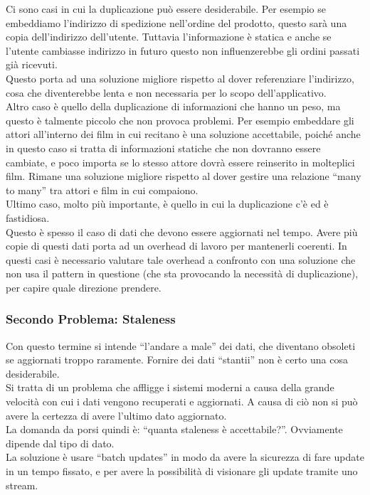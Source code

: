 \noindent Ci sono casi in cui la duplicazione può essere desiderabile. Per esempio se embeddiamo l'indirizzo di spedizione nell'ordine del prodotto, questo sarà una copia dell'indirizzo dell'utente. Tuttavia l'informazione è statica e anche se l'utente cambiasse indirizzo in futuro questo non influenzerebbe gli ordini passati già ricevuti.\\
Questo porta ad una soluzione migliore rispetto al dover referenziare l'indirizzo, cosa che diventerebbe lenta e non necessaria per lo scopo dell'applicativo.\\

\noindent Altro caso è quello della duplicazione di informazioni che hanno un peso, ma questo è talmente piccolo che non provoca problemi. Per esempio embeddare gli attori all'interno dei film in cui recitano è una soluzione accettabile, poiché anche in questo caso si tratta di informazioni statiche che non dovranno essere cambiate, e poco importa se lo stesso attore dovrà essere reinserito in molteplici film. Rimane una soluzione migliore rispetto al dover gestire una relazione ``many to many'' tra attori e film in cui compaiono.\\

\noindent Ultimo caso, molto più importante, è quello in cui la duplicazione c'è ed è fastidiosa.\\
Questo è spesso il caso di dati che devono essere aggiornati nel tempo. Avere più copie di questi dati porta ad un overhead di lavoro per mantenerli coerenti. In questi casi è necessario valutare tale overhead a confronto con una soluzione che non usa il pattern in questione (che sta provocando la necessità di duplicazione), per capire quale direzione prendere.\\

\subsubsection{Secondo Problema: Staleness}
Con questo termine si intende ``l'andare a male'' dei dati, che diventano obsoleti se aggiornati troppo raramente. Fornire dei dati ``stantii'' non è certo una cosa desiderabile.\\
Si tratta di un problema che affligge i sistemi moderni a causa della grande velocità con cui i dati vengono recuperati e aggiornati. A causa di ciò non si può avere la certezza di avere l'ultimo dato aggiornato.\\
La domanda da porsi quindi è: ``quanta staleness è accettabile?''. Ovviamente dipende dal tipo di dato.\\
La soluzione è usare ``batch updates'' in modo da avere la sicurezza di fare update in un tempo fissato, e per avere la possibilità di visionare gli update tramite uno stream.\\


